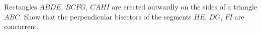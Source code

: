 Rectangles $ABDE$, $BCFG$, $CAHI$ are erected outwardly on the sides of a triangle $ABC$. Show that the perpendicular bisectors of the segments $HE$, $DG$, $FI$ are concurrent.
